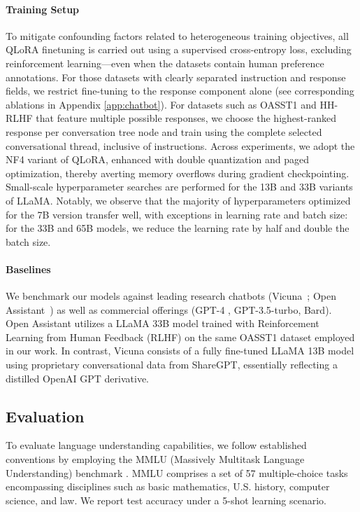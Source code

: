 \paragraph{Training Setup} To mitigate confounding factors related to heterogeneous training objectives, all QLoRA finetuning is carried out using a supervised cross-entropy loss, excluding reinforcement learning—even when the datasets contain human preference annotations. For those datasets with clearly separated instruction and response fields, we restrict fine-tuning to the response component alone (see corresponding ablations in Appendix \ref{app:chatbot}). For datasets such as OASST1 and HH-RLHF that feature multiple possible responses, we choose the highest-ranked response per conversation tree node and train using the complete selected conversational thread, inclusive of instructions. Across experiments, we adopt the NF4 variant of \textsc{QLoRA}, enhanced with double quantization and paged optimization, thereby averting memory overflows during gradient checkpointing. Small-scale hyperparameter searches are performed for the 13B and 33B variants of LLaMA. Notably, we observe that the majority of hyperparameters optimized for the 7B version transfer well, with exceptions in learning rate and batch size: for the 33B and 65B models, we reduce the learning rate by half and double the batch size.

\paragraph{Baselines} We benchmark our models against leading research chatbots (Vicuna~\citep{vicuna2023}; Open Assistant~\citep{kopf2023openassistant}) as well as commercial offerings (GPT-4 \citep{openai2023gpt}, GPT-3.5-turbo, Bard). Open Assistant utilizes a LLaMA 33B model trained with Reinforcement Learning from Human Feedback (RLHF) on the same OASST1 dataset employed in our work. In contrast, Vicuna consists of a fully fine-tuned LLaMA 13B model using proprietary conversational data from ShareGPT, essentially reflecting a distilled OpenAI GPT derivative.

\subsection{Evaluation}

To evaluate language understanding capabilities, we follow established conventions by employing the MMLU (Massively Multitask Language Understanding) benchmark \citep{hendrycksmeasuring}. MMLU comprises a set of 57 multiple-choice tasks encompassing disciplines such as basic mathematics, U.S. history, computer science, and law. We report test accuracy under a 5-shot learning scenario.


